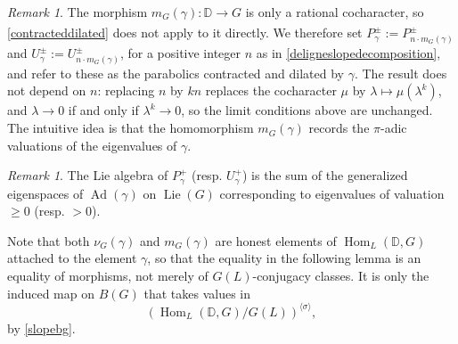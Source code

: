 \documentclass[11pt,a4paper]{article}
\theoremstyle{definition}
\theoremstyle{plain}
\theoremstyle{remark}
\newtheorem{R}[shared]{Remark}
\theoremstyle{plain}
\DeclareMathOperator{\Hom}{Hom}
\DeclareMathOperator{\Lie}{Lie}
\DeclareMathOperator{\Ad}{Ad}
\begin{document}
\begin{R}\label{parabolicsofgamma}
    The morphism $m_G(\gamma): \mathbb{D} \xrightarrow[]{} G$ is only a rational cocharacter, so \ref{contracteddilated} does not apply to it directly. We therefore set $P_{\gamma}^{\pm} := P_{n \cdot m_G(\gamma)}^{\pm}$ and $U_{\gamma}^{\pm} := U_{n \cdot m_G(\gamma)}^{\pm}$, for a positive integer $n$ as in \ref{deligneslopedecomposition}, and refer to these as the parabolics contracted and dilated by $\gamma$. The result does not depend on $n$: replacing $n$ by $kn$ replaces the cocharacter $\mu$ by $\lambda \mapsto \mu(\lambda^k)$, and $\lambda \to 0$ if and only if $\lambda^k \to 0$, so the limit conditions above are unchanged. The intuitive idea is that the homomorphism $m_G(\gamma)$ records the $\pi$-adic valuations of the eigenvalues of $\gamma$.
\end{R}

\begin{R}\label{liealgebraparabolic}
    The Lie algebra of $P_{\gamma}^+$ (resp. $U_{\gamma}^+$) is the sum of the generalized eigenspaces of $\Ad(\gamma)$ on $\Lie(G)$ corresponding to eigenvalues of valuation $\geq 0$ (resp. $>0$).
\end{R}

Note that both $\nu_G(\gamma)$ and $m_G(\gamma)$ are honest elements of $\Hom_L(\mathbb{D}, G)$ attached to the element $\gamma$, so that the equality in the following lemma is an equality of morphisms, not merely of $G(L)$-conjugacy classes. It is only the induced map on $B(G)$ that takes values in
$$(\Hom_L(\mathbb{D}, G)/G(L))^{\langle \sigma \rangle},$$
by \ref{slopebg}.
\end{document}
